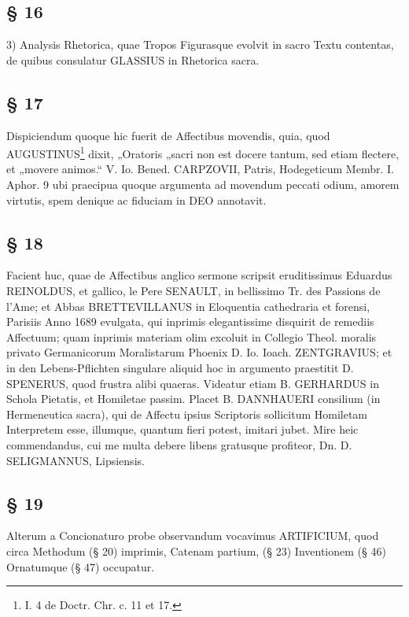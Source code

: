 \subsection{§ 16}

3) Analysis Rhetorica, quae Tropos Figurasque evolvit in sacro Textu contentas, de quibus consulatur GLASSIUS in Rhetorica sacra.

\subsection{§ 17}

Dispiciendum quoque hic fuerit de Affectibus movendis, quia, quod AUGUSTINUS\footnote{I. 4 de Doctr. Chr. c. 11 et 17.} dixit, „Oratoris „sacri non est docere tantum, sed etiam flectere, et „movere animos.“ V. Io. Bened. CARPZOVII, Patris, Hodegeticum Membr. I. Aphor. 9 ubi praecipua quoque argumenta ad movendum peccati odium, amorem virtutis, spem denique ac fiduciam in DEO annotavit.

\subsection{§ 18}

Facient huc, quae de Affectibus anglico sermone scripsit eruditissimus Eduardus REINOLDUS, et gallico, le Pere SENAULT, in bellissimo Tr. des Passions de l’Ame; et Abbas BRETTEVILLANUS in Eloquentia cathedraria et forensi, Parisiis Anno 1689 evulgata, qui inprimis elegantissime disquirit de remediis Affectuum; quam inprimis materiam olim excoluit in Collegio Theol. moralis privato Germanicorum Moralistarum Phoenix D. Io. Ioach. ZENTGRAVIUS; et in den Lebens-Pflichten singulare aliquid hoc in argumento praestitit D. SPENERUS, quod frustra alibi quaeras. Videatur etiam B. GERHARDUS in Schola Pietatis, et Homiletae passim. Placet B. DANNHAUERI consilium (in Hermeneutica sacra), qui de Affectu ipsius Scriptoris sollicitum Homiletam Interpretem esse, illumque, quantum fieri potest, imitari jubet. Mire heic commendandus, cui me multa debere libens gratusque profiteor, Dn. D. SELIGMANNUS, Lipsiensis.

\subsection{§ 19}

Alterum a Concionaturo probe observandum vocavimus ARTIFICIUM, quod circa Methodum (§ 20) imprimis, Catenam partium, (§ 23) Inventionem (§ 46) Ornatumque (§ 47) occupatur.

